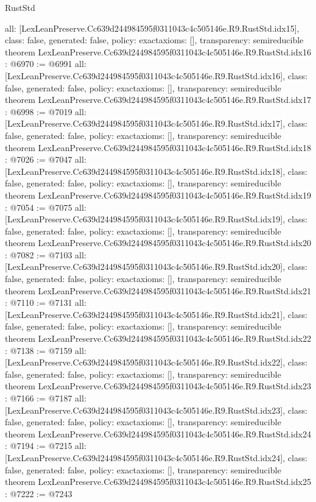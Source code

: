 \begin{lexlean}{RustStd}
\begin{coremodule}
{  all: [LexLeanPreserve.Cc639d244984595f0311043c4c505146e.R9.RustStd.idx15],
  class: false,
  generated: false,
  policy: exact{axioms: []},
  transparency: semireducible
}
theorem LexLeanPreserve.Cc639d244984595f0311043c4c505146e.R9.RustStd.idx16 : @6970 := @6991 {
  all: [LexLeanPreserve.Cc639d244984595f0311043c4c505146e.R9.RustStd.idx16],
  class: false,
  generated: false,
  policy: exact{axioms: []},
  transparency: semireducible
}
theorem LexLeanPreserve.Cc639d244984595f0311043c4c505146e.R9.RustStd.idx17 : @6998 := @7019 {
  all: [LexLeanPreserve.Cc639d244984595f0311043c4c505146e.R9.RustStd.idx17],
  class: false,
  generated: false,
  policy: exact{axioms: []},
  transparency: semireducible
}
theorem LexLeanPreserve.Cc639d244984595f0311043c4c505146e.R9.RustStd.idx18 : @7026 := @7047 {
  all: [LexLeanPreserve.Cc639d244984595f0311043c4c505146e.R9.RustStd.idx18],
  class: false,
  generated: false,
  policy: exact{axioms: []},
  transparency: semireducible
}
theorem LexLeanPreserve.Cc639d244984595f0311043c4c505146e.R9.RustStd.idx19 : @7054 := @7075 {
  all: [LexLeanPreserve.Cc639d244984595f0311043c4c505146e.R9.RustStd.idx19],
  class: false,
  generated: false,
  policy: exact{axioms: []},
  transparency: semireducible
}
theorem LexLeanPreserve.Cc639d244984595f0311043c4c505146e.R9.RustStd.idx20 : @7082 := @7103 {
  all: [LexLeanPreserve.Cc639d244984595f0311043c4c505146e.R9.RustStd.idx20],
  class: false,
  generated: false,
  policy: exact{axioms: []},
  transparency: semireducible
}
theorem LexLeanPreserve.Cc639d244984595f0311043c4c505146e.R9.RustStd.idx21 : @7110 := @7131 {
  all: [LexLeanPreserve.Cc639d244984595f0311043c4c505146e.R9.RustStd.idx21],
  class: false,
  generated: false,
  policy: exact{axioms: []},
  transparency: semireducible
}
theorem LexLeanPreserve.Cc639d244984595f0311043c4c505146e.R9.RustStd.idx22 : @7138 := @7159 {
  all: [LexLeanPreserve.Cc639d244984595f0311043c4c505146e.R9.RustStd.idx22],
  class: false,
  generated: false,
  policy: exact{axioms: []},
  transparency: semireducible
}
theorem LexLeanPreserve.Cc639d244984595f0311043c4c505146e.R9.RustStd.idx23 : @7166 := @7187 {
  all: [LexLeanPreserve.Cc639d244984595f0311043c4c505146e.R9.RustStd.idx23],
  class: false,
  generated: false,
  policy: exact{axioms: []},
  transparency: semireducible
}
theorem LexLeanPreserve.Cc639d244984595f0311043c4c505146e.R9.RustStd.idx24 : @7194 := @7215 {
  all: [LexLeanPreserve.Cc639d244984595f0311043c4c505146e.R9.RustStd.idx24],
  class: false,
  generated: false,
  policy: exact{axioms: []},
  transparency: semireducible
}
theorem LexLeanPreserve.Cc639d244984595f0311043c4c505146e.R9.RustStd.idx25 : @7222 := @7243 {
}
\end{coremodule}
\end{lexlean}
